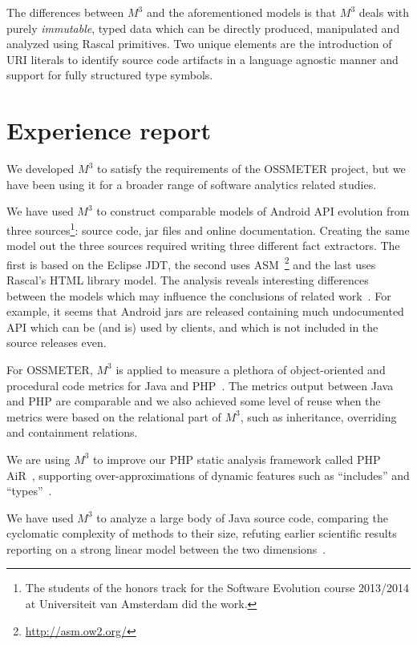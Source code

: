 \documentclass[conference]{IEEEtran}
\newcommand{\mthree}{\ensuremath{M^3}\xspace}
\begin{document}
The differences between \mthree and the aforementioned models is that \mthree
deals with purely \emph{immutable}, typed data which can be directly
produced, manipulated and analyzed using Rascal primitives. Two unique
elements are the introduction of URI literals to identify source code
artifacts in a language agnostic manner and support for fully structured type
symbols.

\section{Experience report}

We developed \mthree to satisfy the requirements of the OSSMETER project, but we have been using it for a broader range of software analytics related studies. 

We have used \mthree to construct comparable models of Android API evolution from three sources\footnote{The students of the honors track for the Software Evolution course 2013/2014 at Universiteit van Amsterdam did the work.}: source code, jar files and online documentation. Creating the same model out the three sources required writing three different fact extractors. The first is based on the Eclipse JDT, the second uses ASM~\footnote{\url{http://asm.ow2.org/}} and the last uses Rascal's HTML library model. The analysis reveals interesting differences between the models which may influence the conclusions of related work~\cite{apianalysis}. For example, it seems that Android jars are released containing much undocumented API which can be (and is) used by clients, and which is not included in the source releases even.

For OSSMETER, \mthree is applied to measure a plethora of object-oriented and procedural code metrics for Java and PHP~\cite{mood,ck}. The metrics output between Java and PHP are comparable and we also achieved some level of reuse when the metrics were based on the relational part of \mthree, such as inheritance, overriding and containment relations.

We are using \mthree to improve our PHP static analysis framework called PHP AiR~\cite{phpair}, supporting over-approximations of dynamic features such as ``includes'' and ``types''~\cite{ase2014}. 

We have used \mthree to analyze a large body of Java source code, comparing the cyclomatic complexity of methods to their size, refuting earlier scientific results reporting on a strong linear model between the two dimensions~\cite{davy}.
\end{document}
